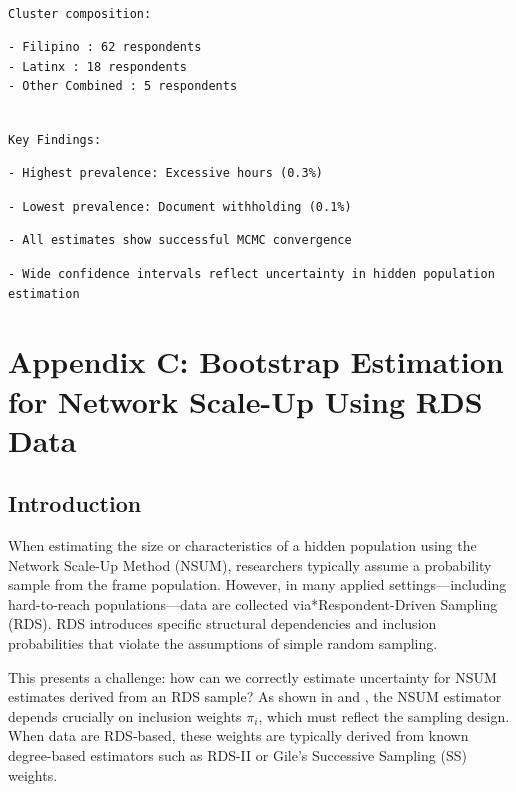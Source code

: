 \documentclass[
  12pt,
  letterpaper,
  DIV=11,
  numbers=noendperiod]{scrartcl}
\theoremstyle{plain}
\theoremstyle{definition}
\begin{document}
\begin{verbatim}

Cluster composition:
\end{verbatim}

\begin{verbatim}
- Filipino : 62 respondents
- Latinx : 18 respondents
- Other Combined : 5 respondents
\end{verbatim}

\begin{verbatim}

Key Findings:
\end{verbatim}

\begin{verbatim}
- Highest prevalence: Excessive hours (0.3%)
\end{verbatim}

\begin{verbatim}
- Lowest prevalence: Document withholding (0.1%)
\end{verbatim}

\begin{verbatim}
- All estimates show successful MCMC convergence
\end{verbatim}

\begin{verbatim}
- Wide confidence intervals reflect uncertainty in hidden population
estimation
\end{verbatim}

\section{Appendix C: Bootstrap Estimation for Network Scale-Up Using RDS
Data}\label{app-3step}

\subsection{Introduction}\label{introduction}

When estimating the size or characteristics of a hidden population using
the Network Scale-Up Method (NSUM), researchers typically assume a
probability sample from the frame population. However, in many applied
settings---including hard-to-reach populations---data are collected
via*Respondent-Driven Sampling (RDS). RDS introduces specific structural
dependencies and inclusion probabilities that violate the assumptions of
simple random sampling.

This presents a challenge: how can we correctly estimate uncertainty for
NSUM estimates derived from an RDS sample? As shown in
\textcite{feeh16-generalized} and \textcite{salg06-variance}, the NSUM
estimator depends crucially on inclusion weights \(\pi_i\), which must
reflect the sampling design. When data are RDS-based, these weights are
typically derived from known degree-based estimators such as RDS-II or
Gile's Successive Sampling (SS) weights.
\end{document}
